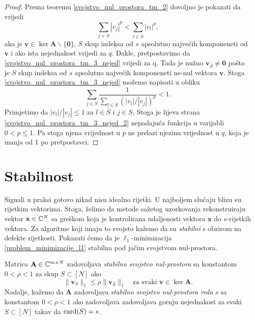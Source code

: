 \documentclass[a4paper,twoside,12pt]{memoir} %
\newcommand{\vect}[1]{\mathbf{#1}}
\renewcommand{\vec}{\vect}
\newcommand{\card}{\text{\normalfont{card}}}
\newcommand{\norm}[1]{\|{#1}\|}
\begin{document}
\begin{proof}
    Prema teoremu \ref{svojstvo_nul_prostora_tm_2} dovoljno je pokazati da vrijedi
    \begin{equation}\label{svojstvo_nul_prostora_tm_3_nejed}
        \sum_{j \in S} |v_j|^p < \sum_{l \in \bar S}|v_l|^p,
    \end{equation}
    ako je $\vec v \in \ker \vec A \backslash \{\vec 0\}$, $S$ skup indeksa od $s$ apsolutno najve\'cih komponeneti od $\vec v$ i ako ista nejednakost vrijedi za $q$.
    Dakle, pretpostavimo da \eqref{svojstvo_nul_prostora_tm_3_nejed} vrijedi za q. Tada je nu\v{z}no $\vec v_{\bar S} \neq \vec 0$ po\v{s}to je $S$ skup indeksa od $s$ apsolutno najve\'cih komponeneti ne-nul vektora $\vec v$. Stoga \eqref{svojstvo_nul_prostora_tm_3_nejed} mo\v{z}emo napisati u obliku
    \begin{equation}\label{svojstvo_nul_prostora_tm_3_nejed_2}
        \sum_{j \in S} \frac{1}{\sum_{l \in \bar S}(|v_l|/|v_j|)^p} < 1.  
    \end{equation}
    Primjetimo da $|v_l|/|v_j| \leq 1$ za $l \in \bar S$ i $j \in S$. Stoga je lijeva strana \eqref{svojstvo_nul_prostora_tm_3_nejed_2} nepadaju\'ca funkcija u varijabli $0<p \leq 1$. Pa stoga njena vrijednost u $p$ ne prelazi njezinu vrijednost u $q$, koja je manja od 1 po pretpostavci.
\end{proof}

\section[Stabilnost][Stabilnost]{Stabilnost}
Signali u praksi gotovo nikad nisu idealno rijetki. U najboljem slu\v{c}aju blizu su rijetkim vektorima. Stoga, \v{z}elimo da metode sa\v{z}etog uzorkovanja rekonstruiraju vektor $\vec x \in \C^N$ sa gre\v{s}kom koja je kontrolirana udaljenosti vektora $\vec x$ do $s$-rijetkih vektora. Za algoritme koji imaju to svojsto ka\v{z}emo da su \textit{stabilni} s obzirom na defekte rijetkosti. Pokazati \'cemo da je $\ell_1$-minimizacija \eqref{problem_minimizacije_l1} stabilna pod ja\v{c}im svojstvom nul-prostora.

\begin{defn}
    Matrica $\vec A \in \C^{m \times N}$ zadovoljava \textit{stabilno svojstvo nul-prostora} sa konstantom $0<\rho<1$ za skup $S \subset [N]$ ako
    \begin{equation*}
        \norm{\vec v_S}_1 \leq \rho \norm{\vec v_{\bar S}}_1 \quad \text{za svaki }\vec v \in \ker \vec A.
    \end{equation*}
    Nadalje, ka\v{z}emo da $\vec A$ zadovoljava \textit{stabilno svojstvo nul-prostora reda} $s$ sa konstantom $0<\rho<1$ ako zadovoljava zadovoljava gornju nejednakost za svaki $S \subset [N]$ takav da $\card(S)=s$.
\end{defn}
\end{document}
